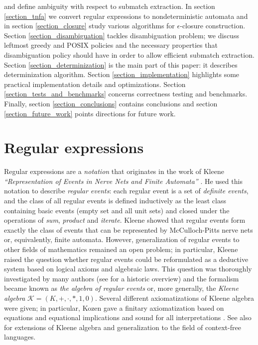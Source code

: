\documentclass{article}
\newcommand{\Xeq}{\!=\!}
\theoremstyle{definition}
\begin{document}
\begin{multicols}{2}
and define ambiguity with respect to submatch extraction.
In section \ref{section_tnfa} we convert regular expressions to nondeterministic automata
and in section \ref{section_closure} study various algorithms for $\epsilon$-closure construction.
Section \ref{section_disambiguation} tackles disambiguation problem;
we discuss leftmost greedy and POSIX policies and the necessary properties that disambiguation policy should have in order to allow efficient submatch extraction.
Section \ref{section_determinization} is the main part of this paper: it describes determinization algorithm.
Section \ref{section_implementation} highlights some practical implementation details and optimizations.
Section \ref{section_tests_and_benchmarks} concerns correctness testing and benchmarks.
Finally, section \ref{section_conclusions} contains conclusions
and section \ref{section_future_work} points directions for future work.

\section{Regular expressions}\label{section_regular_expressions}

Regular expressions are a \emph{notation} that originates in the work of Kleene
\emph{``Representation of Events in Nerve Nets and Finite Automata''} \cite{Kle51} \cite{Kle56}.
He used this notation to describe \emph{regular events}:
each regular event is a set of \emph{definite events},
and the class of all regular events is defined inductively
as the least class containing basic events (empty set and all unit sets)
and closed under the operations of \emph{sum}, \emph{product} and \emph{iterate}.
Kleene showed that regular events form exactly the class of events that can be represented by McCulloch-Pitts nerve nets or, equivalently, finite automata.
However, generalization of regular events to other fields of mathematics remained an open problem;
in particular, Kleene raised the question whether regular events could be reformulated
as a deductive system based on logical axioms and algebraic laws.
This question was thoroughly investigated by many authors (see \cite{Koz94} for a historic overview)
and the formalism became known as \emph{the algebra of regular events}
or, more generally, the \emph{Kleene algebra} $\mathcal{K} \Xeq (K, +, \cdot, *, 1, 0)$.
Several different axiomatizations of Kleene algebra were given;
in particular, Kozen gave a finitary axiomatization based on equations and equational implications and sound for all interpretations \cite{Koz94}.
See also \cite{Gra15} for extensions of Kleene algebra and generalization to the field of context-free languages.
\\


\end{multicols}
\end{document}
